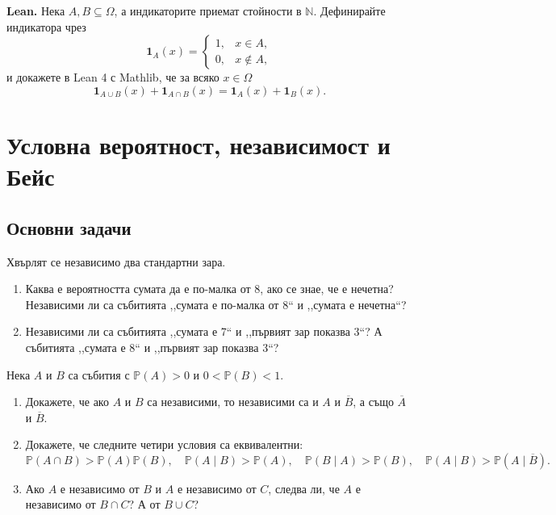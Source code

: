 \documentclass[11pt,a4paper]{article}
\newenvironment{enumeratea}{\begin{enumerate}[label=(\alph*),itemsep=0.28em,topsep=0.25em]}{\end{enumerate}}
\newcommand{\Pbb}{\mathbb P}
\newcommand{\ind}{\mathbf 1}
\newcounter{problem}[section]
\begin{document}
\noindent\textbf{Lean.} Нека $A,B\subseteq\Omega$, а
индикаторите приемат стойности в $\mathbb N$. Дефинирайте индикатора чрез
\[
\ind_A(x)=
\begin{cases}
1,&x\in A,\\
0,&x\notin A,
\end{cases}
\]
и докажете в Lean 4 с Mathlib, че за всяко $x\in\Omega$
\[
\ind_{A\cup B}(x)+\ind_{A\cap B}(x)=\ind_A(x)+\ind_B(x).
\]


\section{Условна вероятност, независимост и Бейс}

\subsection*{Основни задачи}

\begin{problembook}
Хвърлят се независимо два стандартни зара.
\begin{enumeratea}
  \item Каква е вероятността сумата да е по-малка от 8, ако се знае, че е
  нечетна? Независими ли са събитията ,,сумата е по-малка от 8`` и
  ,,сумата е нечетна``?
  \item Независими ли са събитията ,,сумата е 7`` и ,,първият зар показва 3``?
  А събитията ,,сумата е 8`` и ,,първият зар показва 3``?
\end{enumeratea}
\end{problembook}
\begin{problem}
Нека $A$ и $B$ са събития с $\Pbb(A)>0$ и $0<\Pbb(B)<1$.
\begin{enumeratea}
  \item Докажете, че ако $A$ и $B$ са независими, то независими са и
  $A$ и $\overline{B}$, а също $\overline{A}$ и $\overline{B}$.
  \item Докажете, че следните четири условия са еквивалентни:
  \[
  \Pbb(A\cap B)>\Pbb(A)\Pbb(B),\quad
  \Pbb(A\mid B)>\Pbb(A),\quad
  \Pbb(B\mid A)>\Pbb(B),\quad
  \Pbb(A\mid B)>\Pbb(A\mid \overline{B}).
  \]
  \item Ако $A$ е независимо от $B$ и $A$ е независимо от $C$, следва ли,
  че $A$ е независимо от $B\cap C$? А от $B\cup C$?
\end{enumeratea}
\end{problem}
\end{document}
